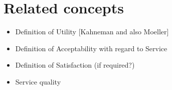 \section{Related concepts}
\begin{itemize}
\item Definition of Utility [Kahneman and also Moeller]
\item Definition of Acceptability with regard to Service
\item Definition of Satisfaction (if required?)
\item Service quality
\end{itemize}